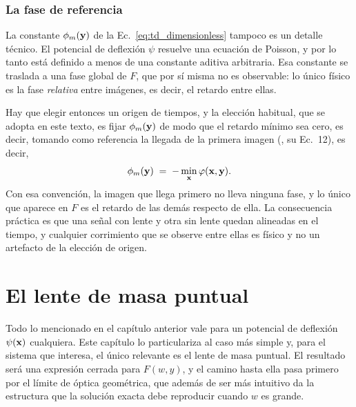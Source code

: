 \documentclass[11pt,a4paper,openany]{book}
\begin{document}
\subsection*{La fase de referencia}

La constante $\phi_m(\vb y)$ de la Ec.~\eqref{eq:td_dimensionless} tampoco es
un detalle t\'ecnico. El potencial de deflexi\'on $\psi$ resuelve una ecuaci\'on
de Poisson, y por lo tanto est\'a definido a menos de una constante aditiva
arbitraria. Esa constante se traslada a una fase global de $F$, que por s\'i
misma no es observable: lo \'unico f\'isico es la fase \emph{relativa} entre
im\'agenes, es decir, el retardo entre ellas.

Hay que elegir entonces un origen de tiempos, y la elecci\'on habitual, que se
adopta en este texto, es fijar $\phi_m(\vb y)$ de modo que el retardo m\'inimo
sea cero, es decir, tomando como referencia la llegada de la primera imagen
(\citealp{Takahashi2003}, su Ec.~12), es decir,
\begin{equation}
  \phi_m(\vb y)\;=\;-\min_{\vb x}\varphi(\vb x,\vb y) .
  \label{eq:Fnorm_ref}
\end{equation}
Con esa convenci\'on, la imagen que
llega primero no lleva ninguna fase, y lo \'unico que aparece en $F$ es el
retardo de las dem\'as respecto de ella. La consecuencia pr\'actica es que una
se\~nal con lente y otra sin lente quedan alineadas en el tiempo, y cualquier
corrimiento que se observe entre ellas es f\'isico y no un artefacto de la
elecci\'on de origen.

\chapter{El lente de masa puntual}
\label{ch:pointlens}

Todo lo mencionado en el cap\'itulo anterior vale para un potencial de
deflexi\'on $\psi(\vb x)$ cualquiera. Este cap\'itulo lo particulariza al
caso m\'as simple y, para el sistema que interesa, el \'unico relevante es el
lente de masa puntual. El resultado ser\'a una expresi\'on cerrada para $F(w,y)$, y el
camino hasta ella pasa primero por el l\'imite de \'optica geom\'etrica, que
adem\'as de ser m\'as intuitivo da la estructura que la soluci\'on exacta debe
reproducir cuando $w$ es grande.

\end{document}
